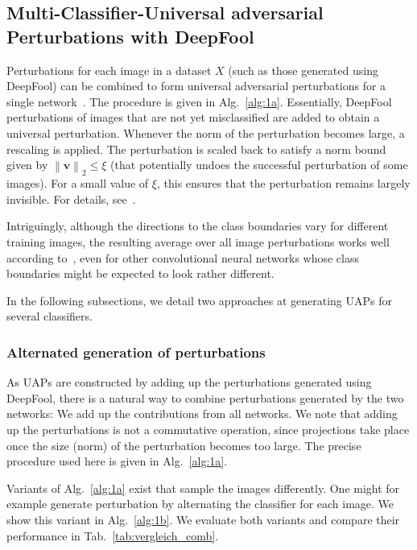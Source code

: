 \documentclass[runningheads]{llncs}
\begin{document}
\subsection{Multi-Classifier-Universal adversarial Perturbations with DeepFool}\label{sec:MultUAP}

Perturbations for each image in a dataset \(X\) (such as those generated using DeepFool) can be combined to form universal adversarial perturbations for a single network~\cite{moosavidezfooli_universal_2017}. The procedure is given in Alg.~\ref{alg:1a}. Essentially, DeepFool perturbations of images that are not yet misclassified are added to obtain a universal perturbation. 
Whenever the norm of the perturbation becomes large, a rescaling is applied. The perturbation is scaled back to satisfy a norm bound given by \(\left\|\mathbf{v}\right\|_2\leq\xi\) (that potentially undoes the successful perturbation of some images). For a small value of \(\xi\), this ensures that the perturbation remains largely invisible. For details, see~\cite{moosavidezfooli_universal_2017}. 

Intriguingly, although the directions to the class boundaries vary for different training images, the resulting average over all image perturbations works well according to~\cite{moosavidezfooli_universal_2017}, even for other convolutional neural networks whose class boundaries might be expected to look rather different. 

In the following subsections, we detail two approaches at generating UAPs for several classifiers.

\subsubsection{Alternated generation of perturbations}
As UAPs are constructed by adding up the perturbations generated using DeepFool, there is a natural way to combine perturbations generated by the two networks: We add up the contributions from all networks. We note that adding up the perturbations is not a commutative operation, since projections take place once the size (norm) of the perturbation becomes too large. The precise procedure used here is given in Alg.~\ref{alg:1a}. 

Variants of Alg.~\ref{alg:1a} exist that sample the images differently. One might for example generate perturbation by alternating the classifier for each image. We show this variant in Alg.~\ref{alg:1b}. We evaluate both variants and compare their performance in Tab.~\ref{tab:vergleich_comb}. 
 
\end{document}
